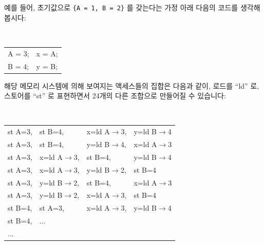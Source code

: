 예를 들어, 초기값으로 {\tt \{A = 1, B = 2\}} 를 갖는다는 가정 아래 다음의
코드를 생각해 봅시다:

\vspace{5pt}
\begin{minipage}[t]{\columnwidth}
\tt
\scriptsize
\begin{tabular}{l|l}
	\nf{CPU 1} &	\nf{CPU 2} \\
	\hline
	A = 3; &	x = A; \\
	B = 4; &	y = B; \\
\end{tabular}
\end{minipage}
\vspace{5pt}

해당 메모리 시스템에 의해 보여지는 액세스들의 집합은 다음과 같이, 로드를 ``ld''
로, 스토어를 ``st'' 로 표현하면서 24개의 다른 조합으로 만들어질 수 있습니다:

\vspace{5pt}
\begin{minipage}[t]{\columnwidth}
\tt
\scriptsize
\begin{tabular}{llll}
	st A=3, & st B=4, & x=ld A$\rightarrow$3, & y=ld B$\rightarrow$4 \\
	st A=3, & st B=4, & y=ld B$\rightarrow$4, & x=ld A$\rightarrow$3 \\
	st A=3, & x=ld A$\rightarrow$3, & st B=4, & y=ld B$\rightarrow$4 \\
	st A=3, & x=ld A$\rightarrow$3, & y=ld B$\rightarrow$2, & st B=4 \\
	st A=3, & y=ld B$\rightarrow$2, & st B=4, & x=ld A$\rightarrow$3 \\
	st A=3, & y=ld B$\rightarrow$2, & x=ld A$\rightarrow$3, & st B=4 \\
	st B=4, & st A=3, & x=ld A$\rightarrow$3, & y=ld B$\rightarrow$4 \\
	st B=4, & ... & & \\
	... & & & \\
\end{tabular}
\end{minipage}
\vspace{5pt}


